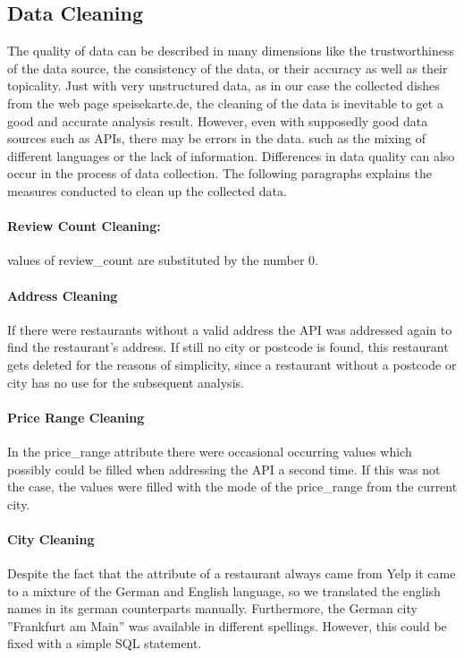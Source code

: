 \subsection{Data Cleaning}
\label{subsec:cleaning}
The quality of data can be described in many dimensions like \eg{} the trustworthiness of the data source, the consistency of the data,
or their accuracy as well as their topicality\cite{QD15}.
Just with very unstructured data, as in our case the collected dishes from the web page speisekarte.de, the cleaning of the data is
inevitable to get a good and accurate analysis result.
However, even with supposedly good data sources such as \acp{API}, there may be errors in the data.
such as \eg{} the mixing of different languages or the lack of information.
Differences in data quality can also occur in the process of data collection.
\newline
The following paragraphs explains the measures conducted to clean up the collected data.
\paragraph{Review Count Cleaning:}  values of review\_count are substituted by the number 0.
\paragraph{Address Cleaning}
If there were restaurants without a valid address the \ylp{} \ac{API} was addressed again to find the restaurant's address.
If still no city or postcode is found, this restaurant gets deleted for the reasons of simplicity, since a restaurant without a postcode or city has no use for the subsequent analysis.
\paragraph{Price Range Cleaning}
In the price\_range attribute there were occasional occurring  values which possibly could be filled when addressing the \ylp{} \ac{API} a second time.
If this was not the case, the  values were filled with the mode of the price\_range from the current city.
\paragraph{City Cleaning}
Despite the fact that the  attribute of a restaurant always came from Yelp it came to a mixture of the German and English language,
so we translated the english names in its german counterparts manually.
Furthermore, the German city ''Frankfurt am Main'' was available in different spellings.
However, this could be fixed with a simple \ac{SQL} statement.
